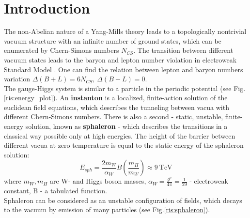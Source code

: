 \documentclass[a4paper,12pt]{article}         %
\begin{document}
\section{Introduction}
The non-Abelian nature of a Yang-Mills theory leads to a topologically nontrivial vacuum structure with an infinite number of ground states, which can be enumerated by Chern-Simons numbers $N_{CS}$. The transition between different vacuum states leads to the baryon and lepton number violation in electroweak Standard Model \cite{rubakov}. One can find the relation between lepton and baryon numbers variation $\Delta (B+L) = 6N_{CS},~\Delta(B-L) = 0$.\\
 The gauge-Higgs system is similar to a particle in the periodic potential (see Fig.\ref{ris:energy_plot}). An \textbf{instanton} is a localized, finite-action solution of the euclidean field equations, which describes the tunneling between vacua with different Chern-Simons numbers. There is also a second - static, unstable, finite-energy solution, known as \textbf{sphaleron} - which describes the transitions in a classical way possible only at high energies. The height of the barrier between different vacua at zero temperature is equal to the static energy of the sphaleron solution:
\begin{equation}\label{sphaleron_energy}
E_{sph} = \frac{2m_W}{\alpha_W}B\left( \frac{m_H}{m_W}\right)\approx 9~\text{TeV}
\end{equation}
where $m_W, m_H$ are W- and Higgs boson masses, $\alpha_W=\frac{g^2}{4\pi}=\frac{1}{29}$ - electroweak constant, B - a tabulated function.\\
Sphaleron can be considered as an unstable configuration of fields, which decays to the vacuum by emission of many particles (see Fig.\ref{ris:sphaleron}).
\end{document}
